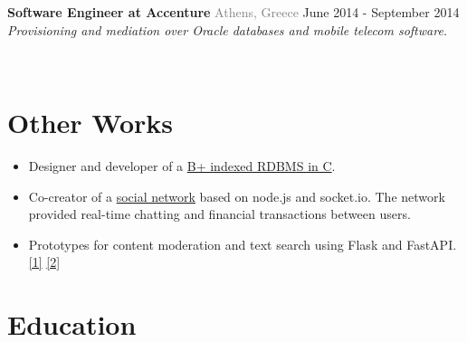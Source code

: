\documentclass{article}
\begin{document}
        \begin{flushleft}
            \textbf{\large Software Engineer at Accenture} {\footnotesize \textcolor{gray}{Athens, Greece}} \hfill \small June 2014 - September 2014  \newline
        \textit{Provisioning and mediation over Oracle databases and mobile telecom software. } \par
           \\ [1ex]
        \end{flushleft}
    
    \vspace{+0.5cm}
    
        \section*{\color{NavyBlue}Other Works}
        \vspace{-0.5cm}
        {\color{NavyBlue}\hrulefill}
        \begin{itemize}[label=\raisebox{0.25ex}{\tiny$\bullet$}, leftmargin=1.5em, labelsep=0.3em]
            \item Designer and developer of a \href{https://github.com/tonyflow/b-RDBMS}{B+ indexed RDBMS in C}.
            \item Co-creator of a \href{https://github.com/tonyflow/mutiny}{social network} based on node.js and socket.io. The network provided real-time chatting and financial transactions between users.
                \item Prototypes for content moderation and text search using Flask and FastAPI. \href{https://github.com/tonyflow/content-moderator-api}{[1]} \href{https://github.com/tonyflow/natural-language-search-api}{[2]}
            \end{itemize}
                

        \section*{\color{NavyBlue} Education}
    \vspace{-0.5cm}
    {\color{NavyBlue} \hrulefill}
    
\end{document}
